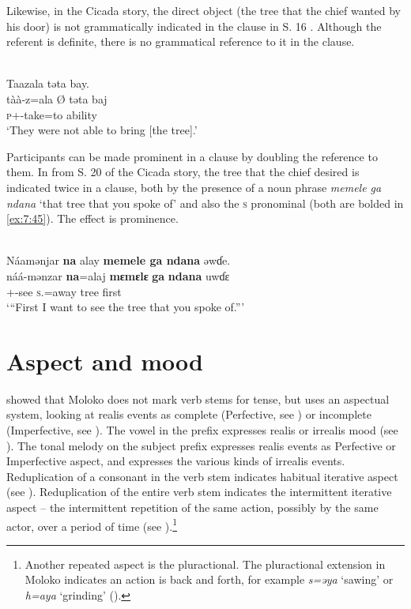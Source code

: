 Likewise, in the Cicada story, the direct object (the tree that the chief wanted by his door) is not grammatically indicated in the clause in S. 16 . Although the referent is definite, there is no grammatical reference to it in the clause. 


\ea\label{ex:7:44}\\
Taazala təta  bay. \\
\gll tàà-z=ala             Ø  təta    baj \\
\textsc{p}+{\HOR}-take=to   {}     ability  {\NEG}\\
\glt ‘They were not able to bring [the tree].’  
\z

Participants can be made prominent in a clause by doubling the reference to them. In  from S. 20 of the Cicada story, the tree that the chief desired is indicated twice in a clause, both by the presence of a noun phrase \textit{memele ga ndana} ‘that tree that you spoke of’ and also the \textsc{s} \DO pronominal (both are bolded in \ref{ex:7:45}). The effect is prominence. 


\ea\label{ex:7:45}\\
Náamənjar  \textbf{na}  alay  \textbf{memele  ga  ndana}  əwɗe.\\
\gll náá-mənzar    \textbf{na}=alaj   \textbf{mɛmɛlɛ}  \textbf{ga}   \textbf{ndana}  uwɗɛ\\
{\oneS}+{\POT}-see   \textsc{s}.{\DO}=away   tree   {\ADJ}  {\DEM}   first\\
\glt ‘“First I want to see the tree that you spoke of.”’
\z

\section{Aspect and mood}\label{sec:7.4}
\hypertarget{RefHeading1212201525720847}{}
\citet{FriesenMamalis2008} showed that Moloko does not mark verb stems for tense, but uses an aspectual system, looking at realis events as complete (Perfective, see ) or incomplete (Imperfective, see ). The vowel in the prefix expresses realis or irrealis mood (see ). The tonal melody on the subject prefix expresses realis events as Perfective or Imperfective aspect, and expresses the various kinds of irrealis events. Reduplication of a consonant in the verb stem indicates habitual iterative aspect (see ). Reduplication of the entire verb stem indicates the intermittent iterative aspect -- the intermittent repetition of the same action, possibly by the same actor, over a period of time (see ).\footnote{Another repeated aspect is the pluractional. The pluractional extension in Moloko indicates an action is back and forth, for example \textit{s=əya} ‘sawing’ or \textit{h=aya} ‘grinding’ ().}

